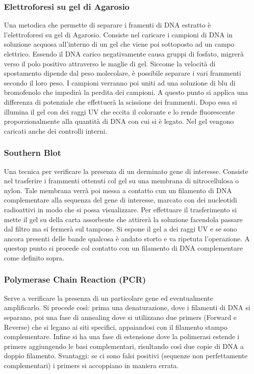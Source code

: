 \documentclass[a4paper]{article}
\begin{document}
\subsubsection{Elettroforesi su gel di Agarosio}
Una metodica che permette di separare i framenti di DNA estratto è
l'elettroforesi su gel di Agarosio. Consiste nel caricare i campioni di DNA 
in soluzione acquosa all'interno di un gel che viene poi sottoposto ad un 
campo elettrico. Essendo il DNA carico negativamente causa gruppi di fosfato,
migrerà verso il polo positivo attraverso le maglie di gel. Siccome la velocità
di spostamento dipende dal peso molecolare, è possibile separare i vari 
frammenti secondo il loro peso. I campioni verranno poi uniti ad una soluzione
di blu di bromofenolo che impedirà la perdita dei campioni. A questo punto si
applica una differenza di potenziale che effettuerà la scissione dei frammenti.
Dopo essa si illumina il gel con dei raggi UV che eccita il colorante e lo 
rende fluorescente proporzionalmente alla quantità di DNA con cui si è legato.
Nel gel vengono caricati anche dei controlli interni.
\subsubsection{Southern Blot}
Una tecnica per verificare la presenza di un derminato gene di interesse.
Consiste nel trasferire i frammenti ottenuti col gel su una membrana di 
nitrocellulosa o nylon. Tale membrana verrà poi messa a contatto cun un 
filamento di DNA complementare alla sequenza del gene di interesse, marcato 
con dei nucleotidi radioattivi in modo che si possa visualizzare. Per 
effettuare il trasferimento si mette il gel su della carta assorbente che 
attirerà la soluzione facendola passare dal filtro ma si fermerà sul tampone.
Si espone il gel a dei raggi UV e se sono ancora presenti delle bande
qualcosa è andato storto e va ripetuta l'operazione. A questop punto si
procede col contatto con un filamento di DNA complementare come definito sopra.
\subsubsection{Polymerase Chain Reaction (PCR)}
Serve a verificare la presenza di un particolare gene ed eventualmente
amplificarlo. Si procede così: prima una denaturazione, dove i filamenti di 
DNA si separano, poi una fase di annealing dove si utilizzano due primers 
(Forward e Reverse) che si legano ai siti specifici, appaiandosi con il 
filamento stampo complementare. Infine si ha una fase di estensione dove
la polimerasi estende i primers aggiungendo le basi complementari, risultando
così due copie di DNA a doppio filamento. Svantaggi: se ci sono falsi positivi
(sequenze non perfettamente complementari) i primers si accoppiano in maniera
errata.
\end{document}
